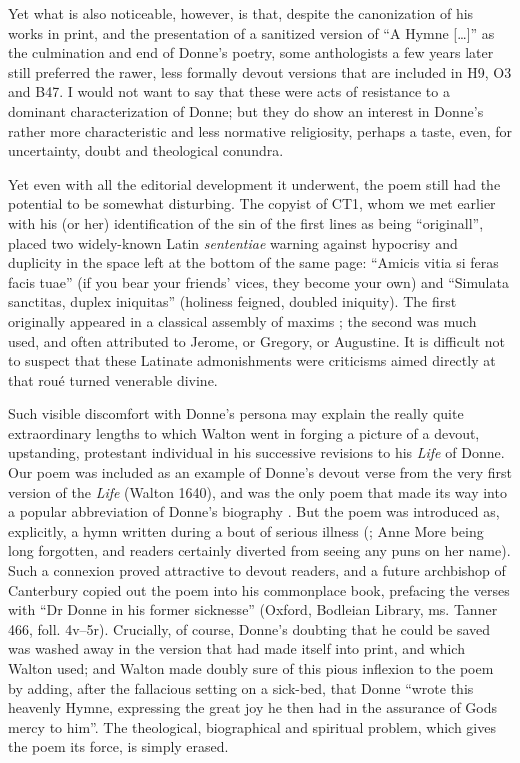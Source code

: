 \begin{paper}
Yet what is also noticeable, however, is that, despite the canonization
of his works in print, and the presentation of a sanitized version of
``A Hymne {[}\ldots{}{]}'' as the culmination and end of Donne's poetry, some
anthologists a few years later still preferred the rawer, less formally
devout versions that are included in H9, O3 and B47. I would not want to
say that these were acts of resistance to a dominant characterization of
Donne; but they do show an interest in Donne's rather more
characteristic and less normative religiosity, perhaps a taste, even,
for uncertainty, doubt and theological conundra.

Yet even with all the editorial development it underwent, the poem still
had the potential to be somewhat disturbing. The copyist of CT1, whom we
met earlier with his (or her) identification of the sin of the first
lines as being ``originall'', placed two widely-known Latin
\emph{sententiae} warning against hypocrisy and duplicity in the space
left at the bottom of the same page: ``Amicis vitia si feras facis
tuae'' (if you bear your friends' vices, they become your own) and
``Simulata sanctitas, duplex iniquitas'' (holiness feigned, doubled
iniquity). The first originally appeared in a classical assembly of
maxims \citep[4]{duff_minor_1934}; the second was much used, and
often attributed to Jerome, or Gregory, or Augustine. It is difficult
not to suspect that these Latinate admonish­ments were criticisms aimed
directly at that roué turned venerable divine.

Such visible discomfort with Donne's persona may explain the really
quite extraordinary lengths to which Walton went in forging a picture of
a devout, upstanding, protestant individual in his successive revisions
to his \emph{Life} of Donne. Our poem was included as an example of
Donne's devout verse from the very first version of the \emph{Life}
(Walton 1640), and was the only poem that made its way into a popular
abbreviation of Donne's biography \citep[120]{winstanley_lives_1687}. But the poem
was introduced as, explicitly, a hymn written during a bout of serious
illness (\citealt[fol. 84v]{walton_lxxx_1640}; Anne More being long forgotten, and
readers certainly diverted from seeing any puns on her name). Such a
connexion proved attractive to devout readers, and a future archbishop
of Canterbury copied out the poem into his commonplace book, prefacing
the verses with ``Dr Donne in his former sicknesse'' (Oxford, Bodleian
Library, ms. Tanner 466, foll. 4v--5r). Crucially, of course, Donne's
doubting that he could be saved was washed away in the version that had
made itself into print, and which Walton used; and Walton made doubly
sure of this pious inflexion to the poem by adding, after the fallacious
setting on a sick-bed, that Donne ``wrote this heavenly Hymne,
expressing the great joy he then had in the assurance of Gods mercy to
him''. The theological, biographical and spiritual problem, which gives
the poem its force, is simply erased.


\end{paper}
